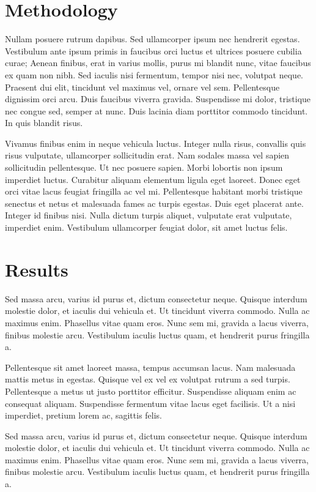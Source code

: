 \documentclass[a4paper,fleqn]{cas-dc}
\begin{document}
\section{Methodology}

Nullam posuere rutrum dapibus. Sed ullamcorper ipsum nec hendrerit egestas. Vestibulum ante ipsum primis in faucibus orci luctus et ultrices posuere cubilia curae; Aenean finibus, erat in varius mollis, purus mi blandit nunc, vitae faucibus ex quam non nibh. Sed iaculis nisi fermentum, tempor nisi nec, volutpat neque. Praesent dui elit, tincidunt vel maximus vel, ornare vel sem. Pellentesque dignissim orci arcu. Duis faucibus viverra gravida. Suspendisse mi dolor, tristique nec congue sed, semper at nunc. Duis lacinia diam porttitor commodo tincidunt. In quis blandit risus.

Vivamus finibus enim in neque vehicula luctus. Integer nulla risus, convallis quis risus vulputate, ullamcorper sollicitudin erat. Nam sodales massa vel sapien sollicitudin pellentesque. Ut nec posuere sapien. Morbi lobortis non ipsum imperdiet luctus. Curabitur aliquam elementum ligula eget laoreet. Donec eget orci vitae lacus feugiat fringilla ac vel mi. Pellentesque habitant morbi tristique senectus et netus et malesuada fames ac turpis egestas. Duis eget placerat ante. Integer id finibus nisi. Nulla dictum turpis aliquet, vulputate erat vulputate, imperdiet enim. Vestibulum ullamcorper feugiat dolor, sit amet luctus felis.

\section{Results}

Sed massa arcu, varius id purus et, dictum consectetur neque. Quisque interdum molestie dolor, et iaculis dui vehicula et. Ut tincidunt viverra commodo. Nulla ac maximus enim. Phasellus vitae quam eros. Nunc sem mi, gravida a lacus viverra, finibus molestie arcu. Vestibulum iaculis luctus quam, et hendrerit purus fringilla a.

Pellentesque sit amet laoreet massa, tempus accumsan lacus. Nam malesuada mattis metus in egestas. Quisque vel ex vel ex volutpat rutrum a sed turpis. Pellentesque a metus ut justo porttitor efficitur. Suspendisse aliquam enim ac consequat aliquam. Suspendisse fermentum vitae lacus eget facilisis. Ut a nisi imperdiet, pretium lorem ac, sagittis felis.

Sed massa arcu, varius id purus et, dictum consectetur neque. Quisque interdum molestie dolor, et iaculis dui vehicula et. Ut tincidunt viverra commodo. Nulla ac maximus enim. Phasellus vitae quam eros. Nunc sem mi, gravida a lacus viverra, finibus molestie arcu. Vestibulum iaculis luctus quam, et hendrerit purus fringilla a.
\end{document}
